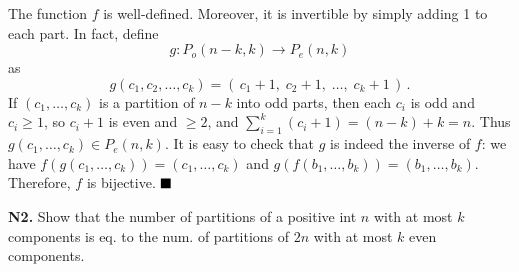 \documentclass[docmute]{article}
\begin{document}
\begin{itemize}
  The function $f$ is well-defined. Moreover, it is invertible by simply adding 1 to each part. In fact, define 
  \[
    g: P_o(n-k,k) \to P_e(n,k)
  \] 
  as 
  \[
    g(c_1,c_2,\ldots,c_k) = (\,c_1 + 1,\; c_2 + 1,\; \ldots,\; c_k + 1\,)\,. 
  \] 
  If $(c_1,\ldots,c_k)$ is a partition of $n-k$ into odd parts, then each $c_i$ is odd and $c_i \ge 1$, so $c_i + 1$ is even and $\ge 2$, and $\sum_{i=1}^k (c_i + 1) = (n-k) + k = n$. Thus $g(c_1,\ldots,c_k) \in P_e(n,k)$. It is easy to check that $g$ is indeed the inverse of $f$: we have $f(g(c_1,\ldots,c_k)) = (c_1,\ldots,c_k)$ and $g(f(b_1,\ldots,b_k)) = (b_1,\ldots,b_k)$. Therefore, $f$ is bijective. $\hfill\blacksquare$ %
\end{itemize}

\vspace{1em} %

\noindent\textbf{N2.} Show that the number of partitions of a positive int $n$ with at most $k$ components is eq. to the num. of partitions of $2n$ with at most $k$ even components.
\end{document}
